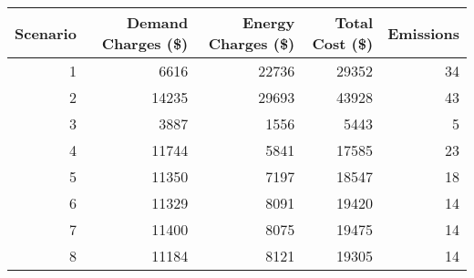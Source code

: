 \begin{tabular}{rrrrr}
\toprule
 Scenario &  Demand Charges (\$) &  Energy Charges (\$) &  Total Cost (\$) &  Emissions \\
\midrule
        1 &                6616 &               22736 &           29352 &         34 \\
        2 &               14235 &               29693 &           43928 &         43 \\
        3 &                3887 &                1556 &            5443 &          5 \\
        4 &               11744 &                5841 &           17585 &         23 \\
        5 &               11350 &                7197 &           18547 &         18 \\
        6 &               11329 &                8091 &           19420 &         14 \\
        7 &               11400 &                8075 &           19475 &         14 \\
        8 &               11184 &                8121 &           19305 &         14 \\
\bottomrule
\end{tabular}
